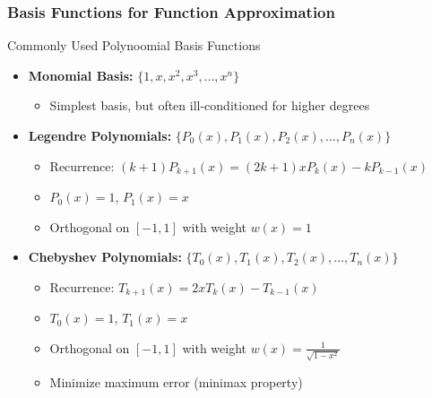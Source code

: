 \documentclass{beamer}
\begin{document}
\begin{frame}
  \frametitle{Basis Functions for Function Approximation}
  
  \begin{block}{Commonly Used Polynoomial Basis Functions}
    \begin{itemize}
      \item \textbf{Monomial Basis:} $\{1, x, x^2, x^3, \ldots, x^n\}$
        \begin{itemize}
          \item Simplest basis, but often ill-conditioned for higher degrees
        \end{itemize}
      
      \item \textbf{Legendre Polynomials:} $\{P_0(x), P_1(x), P_2(x), \ldots, P_n(x)\}$
        \begin{itemize}
          \item Recurrence: $(k+1)P_{k+1}(x) = (2k+1)xP_k(x) - kP_{k-1}(x)$
          \item $P_0(x) = 1$, $P_1(x) = x$
          \item Orthogonal on $[-1,1]$ with weight $w(x) = 1$
        \end{itemize}
      
      \item \textbf{Chebyshev Polynomials:} $\{T_0(x), T_1(x), T_2(x), \ldots, T_n(x)\}$
        \begin{itemize}
          \item Recurrence: $T_{k+1}(x) = 2xT_k(x) - T_{k-1}(x)$
          \item $T_0(x) = 1$, $T_1(x) = x$
          \item Orthogonal on $[-1,1]$ with weight $w(x) = \frac{1}{\sqrt{1-x^2}}$
          \item Minimize maximum error (minimax property)
        \end{itemize}
      
    \end{itemize}
  \end{block}
\end{frame}
\end{document}
